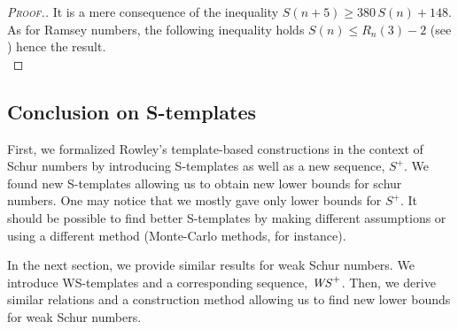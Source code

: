 \begin{proof}[\textsc{Proof.}]
It is a mere consequence of the inequality \( S(n+5) \geqslant 380 \, S(n) + 148\). As for Ramsey
numbers, the following inequality holds \(S(n) \leqslant R_n(3) - 2\) (see \cite{AbbottHanson}) hence the result. \\
\end{proof}


\subsection{Conclusion on S-templates}

First, we formalized Rowley's template-based constructions \cite{RowleyRamsey} in the context of Schur numbers 
by introducing S-templates as well as a new sequence, \(S^+\). We found new S-templates allowing us to obtain 
new lower bounds for schur numbers. One may notice that we mostly gave only lower bounds for \(S^+\). It should be possible to 
find better S-templates by making different assumptions or using a different method (Monte-Carlo methods, for instance).

\par
In the next section, we provide similar results for weak Schur numbers. We introduce WS-templates and a corresponding sequence, 
\(\mathit{WS}^+\). Then, we derive similar relations and a construction method allowing us to find new lower bounds for weak Schur numbers.